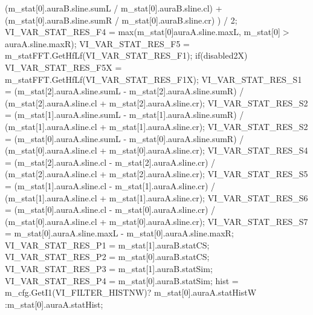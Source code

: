 (m\+\_\+stat\mbox{[}0\mbox{]}.aura\+B.\+sline.\+sum\+L / m\+\_\+stat\mbox{[}0\mbox{]}.aura\+B.\+sline.\+cl) + (m\+\_\+stat\mbox{[}0\mbox{]}.aura\+B.\+sline.\+sum\+R / m\+\_\+stat\mbox{[}0\mbox{]}.aura\+B.\+sline.\+cr) ) / 2; V\+I\+\_\+\+V\+A\+R\+\_\+\+S\+T\+A\+T\+\_\+\+R\+E\+S\+\_\+\+F4 = max(m\+\_\+stat\mbox{[}0\mbox{]}aura\+A.\+sline.\+max\+L, m\+\_\+stat\mbox{[}0\mbox{]}$>$aura\+A.\+sline.\+max\+R); V\+I\+\_\+\+V\+A\+R\+\_\+\+S\+T\+A\+T\+\_\+\+R\+E\+S\+\_\+\+F5 = m\+\_\+stat\+F\+F\+T.\+Get\+Hf\+Lf(\+V\+I\+\_\+\+V\+A\+R\+\_\+\+S\+T\+A\+T\+\_\+\+R\+E\+S\+\_\+\+F1); if(disabled2\+X) V\+I\+\_\+\+V\+A\+R\+\_\+\+S\+T\+A\+T\+\_\+\+R\+E\+S\+\_\+\+F5\+X = m\+\_\+stat\+F\+F\+T.\+Get\+Hf\+Lf(\+V\+I\+\_\+\+V\+A\+R\+\_\+\+S\+T\+A\+T\+\_\+\+R\+E\+S\+\_\+\+F1\+X); V\+I\+\_\+\+V\+A\+R\+\_\+\+S\+T\+A\+T\+\_\+\+R\+E\+S\+\_\+\+S1 = (m\+\_\+stat\mbox{[}2\mbox{]}.aura\+A.\+sline.\+sum\+L -\/ m\+\_\+stat\mbox{[}2\mbox{]}.aura\+A.\+sline.\+sum\+R) / (m\+\_\+stat\mbox{[}2\mbox{]}.aura\+A.\+sline.\+cl + m\+\_\+stat\mbox{[}2\mbox{]}.aura\+A.\+sline.\+cr); V\+I\+\_\+\+V\+A\+R\+\_\+\+S\+T\+A\+T\+\_\+\+R\+E\+S\+\_\+\+S2 = (m\+\_\+stat\mbox{[}1\mbox{]}.aura\+A.\+sline.\+sum\+L -\/ m\+\_\+stat\mbox{[}1\mbox{]}.aura\+A.\+sline.\+sum\+R) / (m\+\_\+stat\mbox{[}1\mbox{]}.aura\+A.\+sline.\+cl + m\+\_\+stat\mbox{[}1\mbox{]}.aura\+A.\+sline.\+cr); V\+I\+\_\+\+V\+A\+R\+\_\+\+S\+T\+A\+T\+\_\+\+R\+E\+S\+\_\+\+S2 = (m\+\_\+stat\mbox{[}0\mbox{]}.aura\+A.\+sline.\+sum\+L -\/ m\+\_\+stat\mbox{[}0\mbox{]}.aura\+A.\+sline.\+sum\+R) / (m\+\_\+stat\mbox{[}0\mbox{]}.aura\+A.\+sline.\+cl + m\+\_\+stat\mbox{[}0\mbox{]}.aura\+A.\+sline.\+cr); V\+I\+\_\+\+V\+A\+R\+\_\+\+S\+T\+A\+T\+\_\+\+R\+E\+S\+\_\+\+S4 = (m\+\_\+stat\mbox{[}2\mbox{]}.aura\+A.\+sline.\+cl -\/ m\+\_\+stat\mbox{[}2\mbox{]}.aura\+A.\+sline.\+cr) / (m\+\_\+stat\mbox{[}2\mbox{]}.aura\+A.\+sline.\+cl + m\+\_\+stat\mbox{[}2\mbox{]}.aura\+A.\+sline.\+cr); V\+I\+\_\+\+V\+A\+R\+\_\+\+S\+T\+A\+T\+\_\+\+R\+E\+S\+\_\+\+S5 = (m\+\_\+stat\mbox{[}1\mbox{]}.aura\+A.\+sline.\+cl -\/ m\+\_\+stat\mbox{[}1\mbox{]}.aura\+A.\+sline.\+cr) / (m\+\_\+stat\mbox{[}1\mbox{]}.aura\+A.\+sline.\+cl + m\+\_\+stat\mbox{[}1\mbox{]}.aura\+A.\+sline.\+cr); V\+I\+\_\+\+V\+A\+R\+\_\+\+S\+T\+A\+T\+\_\+\+R\+E\+S\+\_\+\+S6 = (m\+\_\+stat\mbox{[}0\mbox{]}.aura\+A.\+sline.\+cl -\/ m\+\_\+stat\mbox{[}0\mbox{]}.aura\+A.\+sline.\+cr) / (m\+\_\+stat\mbox{[}0\mbox{]}.aura\+A.\+sline.\+cl + m\+\_\+stat\mbox{[}0\mbox{]}.aura\+A.\+sline.\+cr); V\+I\+\_\+\+V\+A\+R\+\_\+\+S\+T\+A\+T\+\_\+\+R\+E\+S\+\_\+\+S7 = m\+\_\+stat\mbox{[}0\mbox{]}.aura\+A.\+sline.\+max\+L -\/ m\+\_\+stat\mbox{[}0\mbox{]}.aura\+A.\+sline.\+max\+R; V\+I\+\_\+\+V\+A\+R\+\_\+\+S\+T\+A\+T\+\_\+\+R\+E\+S\+\_\+\+P1 = m\+\_\+stat\mbox{[}1\mbox{]}.aura\+B.\+stat\+C\+S; V\+I\+\_\+\+V\+A\+R\+\_\+\+S\+T\+A\+T\+\_\+\+R\+E\+S\+\_\+\+P2 = m\+\_\+stat\mbox{[}0\mbox{]}.aura\+B.\+stat\+C\+S; V\+I\+\_\+\+V\+A\+R\+\_\+\+S\+T\+A\+T\+\_\+\+R\+E\+S\+\_\+\+P3 = m\+\_\+stat\mbox{[}1\mbox{]}.aura\+B.\+stat\+Sim; V\+I\+\_\+\+V\+A\+R\+\_\+\+S\+T\+A\+T\+\_\+\+R\+E\+S\+\_\+\+P4 = m\+\_\+stat\mbox{[}0\mbox{]}.aura\+B.\+stat\+Sim; hist = m\+\_\+cfg.\+Get\+I1(\+V\+I\+\_\+\+F\+I\+L\+T\+E\+R\+\_\+\+H\+I\+S\+T\+N\+W)? m\+\_\+stat\mbox{[}0\mbox{]}.aura\+A.\+stat\+Hist\+W \+:m\+\_\+stat\mbox{[}0\mbox{]}.aura\+A.\+stat\+Hist; 
